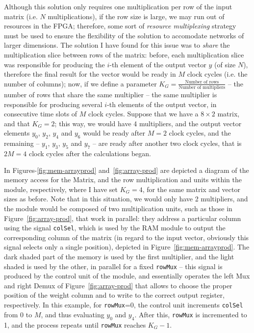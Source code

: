 Although this solution only requires one multiplication per row of the input matrix (i.e. $N$ multiplications), if the row size is large, we may run out of resources in the FPGA; therefore, some sort of \textit{resource multiplexing} strategy must be used to ensure the flexibility of the solution to accomodate networks of larger dimensions. The solution I have found for this issue was to \emph{share} the multiplication slice between rows of the matrix: before, each multiplication slice was responsible for producing the $i$-th element of the output vector $y$ (of size $N$), therefore the final result for the vector would be ready in $M$ clock cycles (i.e. the number of columns); now, if we define a parameter $K_G = \frac{\text{Number of rows}}{\text{Number of multipliers}}$ -- the number of rows that share the same multiplier -- the same multiplier is responsible for producing several $i$-th elements of the output vector, in consecutive time slots of $M$ clock cycles. Suppose that we have a $8\times2$ matrix, and that $K_G = 2$; this way, we would have 4 multipliers, and the output vector elements $y_0$, $y_2$, $y_4$ and $y_6$ would be ready after $M=2$ clock cycles, and the remaining -- $y_1$, $y_3$, $y_5$ and $y_7$ --  are ready after another two clock cycles, that is $2M = 4$ clock cycles after the calculations began. 

In Figures-\ref{fig:mem-arrayprod} and~\ref{fig:array-prod} are depicted a diagram of the memory access for the Matrix, and the row multiplication and units within the module, respectively, where I have set $K_G = 4$, for the same matrix and vector sizes as before. Note that in this situation, we would only have 2 multipliers, and the module would be composed of two multiplication units, such as those in Figure~\ref{fig:array-prod}, that work in parallel: they address a particular column using the signal \verb+colSel+, which is used by the RAM module to output the corresponding column of the matrix (in regard to the input vector, obviously this signal selects only a single position), depicted in Figure~\ref{fig:mem-arrayprod}. The dark shaded part of the memory is used by the first multiplier, and the light shaded is used by the other, in parallel for a fixed \verb+rowMux+ -- this signal is produced by the control unit of the module, and essentially operates the left Mux and right Demux of Figure~\ref{fig:array-prod} that allows to choose the proper position of the weight column and to write to the correct output register, respectively. In this example, for \verb+rowMux+=0, the control unit increments \verb+colSel+ from 0 to $M$, and thus evaluating $y_0$ and $y_4$. After this, \verb+rowMux+ is incremented to 1, and the process repeats until \verb+rowMux+ reaches $K_G-1$. 

